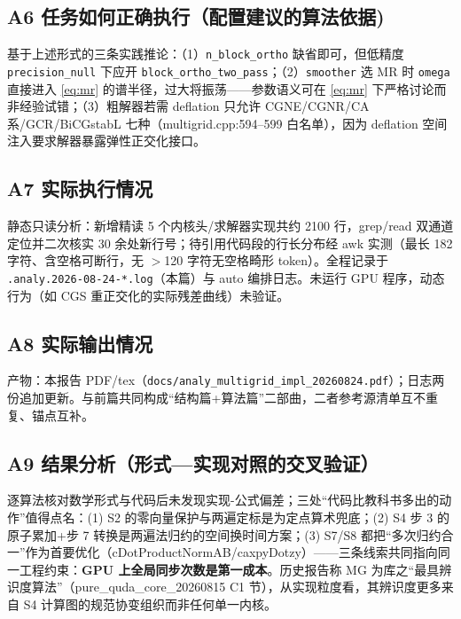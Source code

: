 \documentclass[UTF8]{ctexart}
\begin{document}
\subsection{A6 任务如何正确执行（配置建议的算法依据)}

基于上述形式的三条实践推论：（1）\texttt{n\_block\_ortho} 缺省即可，但低精度 \texttt{precision\_null} 下应开 \texttt{block\_ortho\_two\_pass}；（2）\texttt{smoother} 选 MR 时 \texttt{omega} 直接进入 \eqref{eq:mr} 的谱半径，过大将振荡——参数语义可在 \eqref{eq:mr} 下严格讨论而非经验试错；（3）粗解器若需 deflation 只允许 CGNE/CGNR/CA 系/GCR/BiCGstabL 七种（multigrid.cpp:594--599 白名单），因为 deflation 空间注入要求解器暴露弹性正交化接口。

\subsection{A7 实际执行情况}

静态只读分析：新增精读 5 个内核头/求解器实现共约 2100 行，grep/read 双通道定位并二次核实 30 余处新行号；待引用代码段的行长分布经 awk 实测（最长 182 字符、含空格可断行，无 $>$120 字符无空格畸形 token）。全程记录于 \texttt{\nolinkurl{.analy.2026-08-24-*.log}}（本篇）与 auto 编排日志。未运行 GPU 程序，动态行为（如 CGS 重正交化的实际残差曲线）\textcolor{warn}{未验证}。

\subsection{A8 实际输出情况}

产物：本报告 PDF/tex（\texttt{\nolinkurl{docs/analy_multigrid_impl_20260824.pdf}}）；日志两份追加更新。与前篇共同构成``结构篇+算法篇''二部曲，二者参考源清单互不重复、锚点互补。

\subsection{A9 结果分析（形式—实现对照的交叉验证）}

逐算法核对数学形式与代码后未发现实现-公式偏差；三处``代码比教科书多出的动作''值得点名：(1) S2 的零向量保护与两遍定标是为定点算术兜底；(2) S4 步 3 的原子累加+步 7 转换是两遍法归约的空间换时间方案；(3) S7/S8 都把``多次归约合一''作为首要优化（cDotProductNormAB/caxpyDotzy）——三条线索共同指向同一工程约束：\textbf{GPU 上全局同步次数是第一成本}。历史报告称 MG 为库之``最具辨识度算法''\textcolor{reference}{（pure\_quda\_core\_20260815 C1 节）}，从实现粒度看，其辨识度更多来自 S4 计算图的规范协变组织而非任何单一内核。
\end{document}
